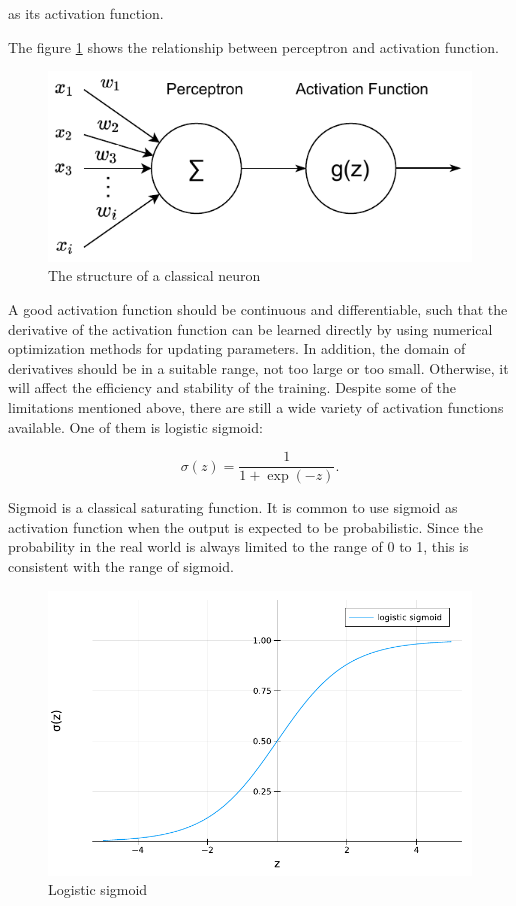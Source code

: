 \documentclass[
	parskip, 			   %
	twoside, 			   %
	DIV=14, 			   %
	BCOR=15.0mm, 		   %
	headsepline, 		   %
	open=right, 		   %
	captions=tableheading, %
	bibliography=totoc,    %
	numbers=noenddot       %
]{scrreprt}
\begin{document}
as its activation function.

The figure \ref{fig:neuron_structure} shows the relationship between perceptron and activation function.

\begin{figure}[h!]
    \centering
    \includegraphics[scale=1]{figures/activation_function.pdf}
    \caption{The structure of a classical neuron}
    \label{fig:neuron_structure}
\end{figure}

A good activation function should be continuous and differentiable, such that the derivative of the activation function can be learned directly by using numerical optimization methods for updating parameters. In addition, the domain of derivatives should be in a suitable range, not too large or too small. Otherwise, it will affect the efficiency and stability of the training. Despite some of the limitations mentioned above, there are still a wide variety of activation functions available. One of them is logistic sigmoid:

\begin{equation}
    \label{eq:sigmoid}
    \sigma(z)=\frac{1}{1+\exp (-z)}.
\end{equation}

Sigmoid is a classical saturating function. It is common to use sigmoid as activation function when the output is expected to be probabilistic. Since the probability in the real world is always limited to the range of 0 to 1, this is consistent with the range of sigmoid.

\begin{figure}[h!]
    \centering
    \includegraphics[scale=0.7]{figures/sigmoid.pdf}
    \caption{Logistic sigmoid}
    \label{fig:sigmoid}
\end{figure}
\end{document}
